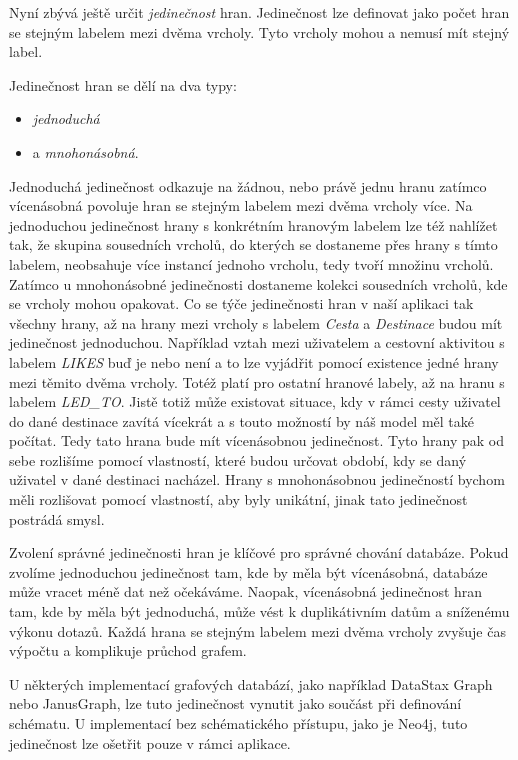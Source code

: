 \documentclass[
  program=infoi,
  biblatex=true,
  sourcecodes=true,
  figures=true,
  glossaries=false,
  index
]{kidiplom}
\begin{document}
Nyní zbývá ještě určit \textit{jedinečnost} hran. Jedinečnost lze definovat jako počet hran se stejným labelem mezi dvěma vrcholy. Tyto vrcholy mohou a nemusí mít stejný label. 

Jedinečnost hran se dělí na dva typy:
\begin{itemize}
\item \textit{jednoduchá}
\item a \textit{mnohonásobná}.
\end{itemize} 

Jednoduchá jedinečnost odkazuje na žádnou, nebo právě jednu hranu zatímco vícenásobná povoluje hran se stejným labelem mezi dvěma vrcholy více. Na jednoduchou jedinečnost hrany s konkrétním hranovým labelem lze též nahlížet tak, že skupina sousedních vrcholů, do kterých se dostaneme přes hrany s tímto labelem, neobsahuje více instancí jednoho vrcholu, tedy tvoří množinu vrcholů. Zatímco u mnohonásobné jedinečnosti dostaneme kolekci sousedních vrcholů, kde se vrcholy mohou opakovat. 
Co se týče jedinečnosti hran v naší aplikaci tak všechny hrany, až na hrany mezi vrcholy s labelem \textit{Cesta} a \textit{Destinace} budou mít jedinečnost jednoduchou. Například vztah mezi uživatelem a cestovní aktivitou s labelem \textit{LIKES} buď je nebo není a to lze vyjádřit pomocí existence jedné hrany mezi těmito dvěma vrcholy. Totéž platí pro ostatní hranové labely, až na hranu s labelem \textit{LED\_TO}. Jistě totiž může existovat situace, kdy v rámci cesty uživatel do dané destinace zavítá vícekrát a s touto možností by náš model měl také počítat. Tedy tato hrana bude mít vícenásobnou jedinečnost. Tyto hrany pak od sebe rozlišíme pomocí vlastností, které budou určovat období, kdy se daný uživatel v dané destinaci nacházel. Hrany s mnohonásobnou jedinečností bychom měli rozlišovat pomocí vlastností, aby byly unikátní, jinak tato jedinečnost postrádá smysl.

Zvolení správné jedinečnosti hran je klíčové pro správné chování databáze. Pokud zvolíme jednoduchou jedinečnost tam, kde by měla být vícenásobná, databáze může vracet méně dat než očekáváme. Naopak, vícenásobná jedinečnost hran tam, kde by měla být jednoduchá, může vést k duplikátivním datům a sníženému výkonu dotazů. Každá hrana se stejným labelem mezi dvěma vrcholy zvyšuje čas výpočtu a komplikuje průchod grafem.

U některých implementací grafových databází, jako například DataStax Graph nebo JanusGraph, lze tuto jedinečnost vynutit jako součást při definování schématu. U implementací bez schématického přístupu, jako je Neo4j, tuto jedinečnost lze ošetřit pouze v rámci aplikace.
\end{document}

